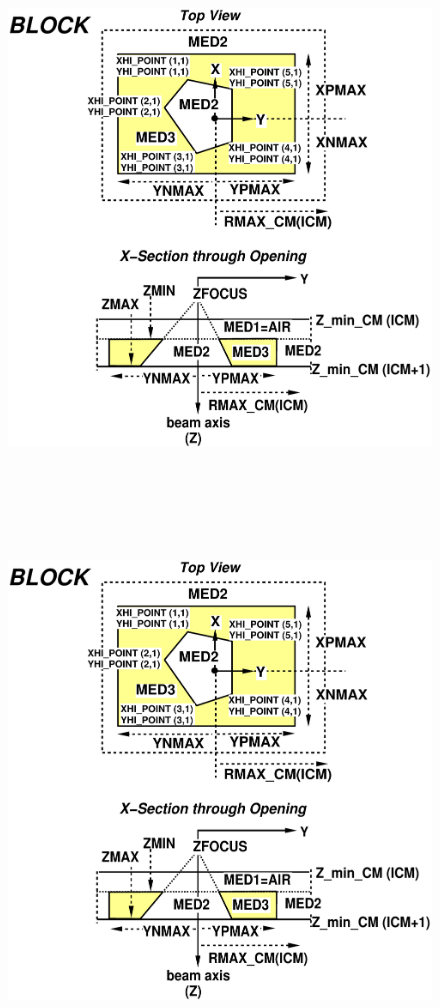 \documentclass[12pt,twoside]{article}
\begin{document}
\newpage
\begin{figure}[tp]
\begin{center}
\leavevmode
\begin{latexonly}
\includegraphics[height=15cm]{figures/blockd}
\end{latexonly}
\begin{htmlonly}
\includegraphics[height=14cm]{figures/blockd}

\end{htmlonly}
\end{center}
\end{figure}
\end{document}
